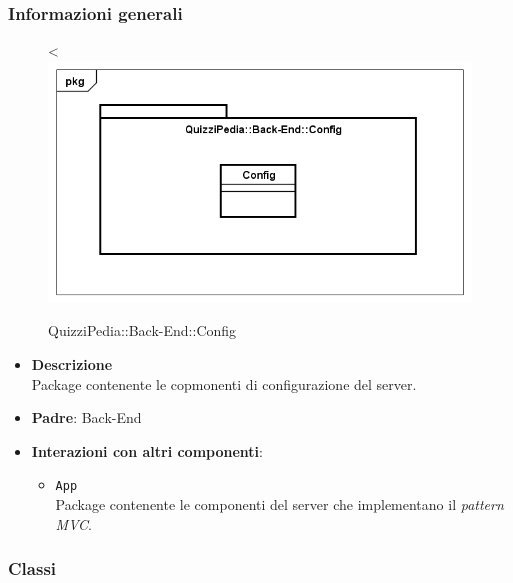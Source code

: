 \subsubsection{Informazioni generali}
\label{QuizziPedia::Back-End::Config}
\begin{figure}
	\centering<
	\includegraphics[scale=0.45]{UML/Package/QuizziPedia_Back-End_Config.png}
	\caption{QuizziPedia::Back-End::Config}
\end{figure}
	\begin{itemize}
		\item \textbf{Descrizione} \\
		Package contenente le copmonenti di configurazione del server.
		\item \textbf{Padre}: Back-End
		\item \textbf{Interazioni con altri componenti}:
			\begin{itemize}
				\item \texttt{App} \\
				Package contenente le componenti del server che implementano il \textit{pattern MVC}.
			\end{itemize}
	\end{itemize}
\subsubsection{Classi}
